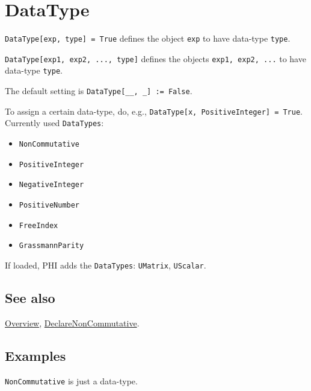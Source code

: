 \documentclass[../FeynCalcManual.tex]{subfiles}
\begin{document}
\hypertarget{datatype}{%
\section{DataType}\label{datatype}}

\texttt{DataType[\allowbreak{}exp,\ \allowbreak{}type] = True} defines
the object \texttt{exp} to have data-type \texttt{type}.

\texttt{DataType[\allowbreak{}exp1,\ \allowbreak{}exp2,\ \allowbreak{}...,\ \allowbreak{}type]}
defines the objects \texttt{exp1,\ \allowbreak{}exp2,\ \allowbreak{}...}
to have data-type \texttt{type}.

The default setting is
\texttt{DataType[\allowbreak{}__,\ \allowbreak{}_] := False}.

To assign a certain data-type, do, e.g.,
\texttt{DataType[\allowbreak{}x,\ \allowbreak{}PositiveInteger] = True}.
Currently used \texttt{DataTypes}:

\begin{itemize}
\item
  \texttt{NonCommutative}
\item
  \texttt{PositiveInteger}
\item
  \texttt{NegativeInteger}
\item
  \texttt{PositiveNumber}
\item
  \texttt{FreeIndex}
\item
  \texttt{GrassmannParity}
\end{itemize}

If loaded, PHI adds the \texttt{DataTypes}: \texttt{UMatrix},
\texttt{UScalar}.

\subsection{See also}

\hyperlink{toc}{Overview},
\hyperlink{declarenoncommutative}{DeclareNonCommutative}.

\subsection{Examples}

\texttt{NonCommutative} is just a data-type.

\begin{Shaded}
\begin{Highlighting}[]
\OperatorTok{[}\OperatorTok{,} \OperatorTok{,}\OperatorTok{]} \ExtensionTok{=} \NormalTok{; }
 
 \ExtensionTok{=}  \SpecialCharTok{{-}}  
\end{Highlighting}
\end{Shaded}
\end{document}

